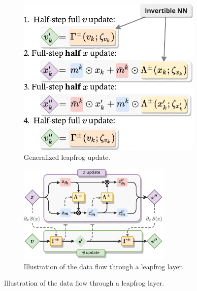 \documentclass[a4paper,11pt]{article}
\begin{document}
\begin{figure}[htpb]
    \centering
    \begin{subfigure}[b]{0.40\textwidth}
        \includegraphics[width=\textwidth]{assets/update_steps.pdf}
        \caption{\label{subfig:updates}Generalized leapfrog update.}
    \end{subfigure}
    \hfill
    \begin{subfigure}[b]{0.55\textwidth}
        \includegraphics[width=\textwidth]{assets/leapfrog_layer.pdf}
        \caption{\label{subfig:lfupdate}Illustration of the data flow
        through a leapfrog layer.}
    \end{subfigure}

\end{figure}
\end{document}
